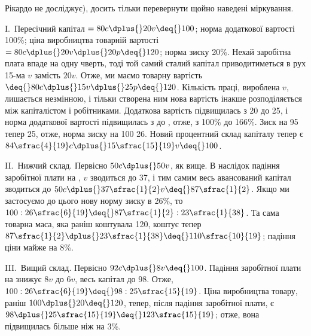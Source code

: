 \parcont{}  %
Рікардо не досліджує), досить тільки перевернути щойно наведені
міркування.

I.~Пересічний капітал $= 80 c \dplus{} 20 v \deq{} 100$; норма додаткової
вартості \deq{} 100\%; ціна виробництва \deq{} товарній вартості $= 80 c \dplus{}
20 v \dplus{} 20 p \deq{} 120$; норма зиску \deq{} 20\%. Нехай заробітна плата
впаде на одну чверть, тоді той самий сталий капітал приводитиметься
в рух 15-ма $v$ замість $20 v$. Отже, ми маємо товарну
вартість $ \deq{} 80 c \dplus{} 15 v \dplus{} 25 p \deq{} 120$. Кількість праці, вироблена $v$,
лишається  незмінною, і тільки створена ним нова вартість інакше
розподіляється між капіталістом і робітниками. Додаткова вартість
підвищилась з 20 до 25, і норма додаткової вартості
підвищилась з  до , отже, з 100\% до 166\%.
Зиск на 95 тепер \deq{} 25, отже, норма зиску на 100 \deq{} 26. Новий
процентний склад капіталу тепер є $84\sfrac{4}{19}c \dplus{} 15\sfrac{15}{19}v \deq{} 100$.

II.~Нижчий склад. Первісно $50 c \dplus{} 50 v$, як вище. В наслідок
падіння заробітної плати на , $v$ зводиться до 37, і тим самим
весь авансований капітал зводиться до $50 c \dplus{} 37\sfrac{1}{2}v \deq{} 87\sfrac{1}{2}$. Якщо
ми застосуємо до цього нову норму зиску в 26\%, то
$100 : 26\sfrac{6}{19} \deq{} 87\sfrac{1}{2} : 23\sfrac{1}{38}$. Та сама товарна маса,
яка раніш коштувала 120, коштує
тепер $87\sfrac{1}{2} \dplus{} 23\sfrac{1}{38} \deq{} 110\sfrac{10}{19}$; падіння ціни
майже на 8\%.

III.~Вищий склад. Первісно $92 c \dplus{} 8 v \deq{} 100$. Падіння заробітної
плати на  знижує $8 v$ до $6 v$, весь капітал до 98. Отже,
$100 : 26\sfrac{6}{19} \deq{} 98 : 25\sfrac{15}{19}$. Ціна виробництва товару,
раніш $100 \dplus{} 20 \deq{} 120$, тепер, після падіння заробітної плати, є
$98 \dplus{} 25\sfrac{15}{19} \deq{} 123\sfrac{15}{19}$;
отже, вона підвищилась більше ніж на 3\%.

